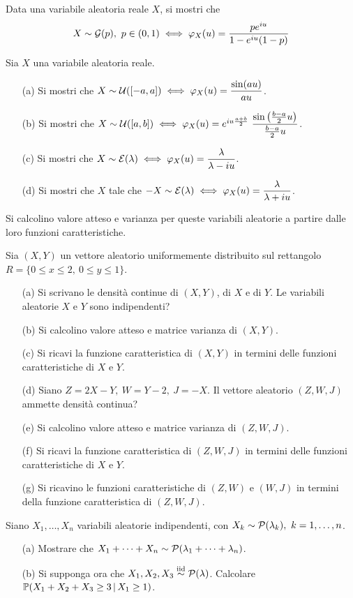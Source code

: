 \Esercizio{} %
Data una variabile aleatoria reale $X$, si mostri che
\[
X\sim \mathcal{G}(p),\ p\in(0,1)\iff \varphi_X(u)=\frac{pe^{iu}}{1-e^{iu}(1-p)}
\]

\Esercizio{} %
Sia $X$ una variabile aleatoria reale.
\begin{enumerate}
\item [(a)] Si mostri che $X\sim \mathcal{U}([-a,a])\iff\varphi_X(u)=\dfrac{\sin(au)}{au}$.
\item [(b)] Si mostri che $X\sim  \Uc([a,b])\iff\varphi_X(u)=e^{iu\frac{a+b}{2}}\ \dfrac{\sin\left(\frac{b-a}{2}u\right)}{\frac{b-a}{2}u}$.
\item [(c)] Si mostri che $X\sim\mathcal{E}(\lambda)\iff\varphi_X(u)=\dfrac{\lambda}{\lambda-iu}$.
\item [(d)] Si mostri che $X$ tale che $-X\sim\mathcal{E}(\lambda)\iff\varphi_X(u)=\dfrac{\lambda}{\lambda+iu}$.
\end{enumerate}
Si calcolino valore atteso e varianza per queste variabili aleatorie a partire dalle loro funzioni caratteristiche.

\Esercizio{} %
Sia $(X,Y)$ un vettore aleatorio uniformemente distribuito sul rettangolo $R=\{0\leq x\leq 2,\ 0\leq y\leq 1\}$.
\begin{itemize}
\item [(a)] Si scrivano le densità continue di $(X,Y)$, di $X$ e di $Y$. Le variabili aleatorie $X$ e $Y$ sono indipendenti?
\item [(b)] Si calcolino valore atteso e matrice varianza di $(X,Y)$.
\item [(c)] Si ricavi la funzione caratteristica di $(X,Y)$ in termini delle funzioni caratteristiche di $X$ e $Y$.
\item [(d)] Siano $Z=2X-Y,\ W=Y-2,\ J=-X$. Il vettore aleatorio $(Z,W,J)$ ammette densità continua?
\item [(e)] Si calcolino valore atteso e matrice varianza di $(Z,W,J)$.
\item [(f)] Si ricavi la funzione caratteristica di $(Z,W,J)$ in termini delle funzioni caratteristiche di $X$ e $Y$.
\item [(g)] Si ricavino le funzioni caratteristiche di $(Z,W)$ e $(W,J)$ in termini della funzione caratteristica di $(Z,W,J)$.
\end{itemize}

\Esercizio{} %
Siano $X_1,\dots,X_n$ variabili aleatorie indipendenti, con $X_k\sim\mathcal{P}(\lambda_k),\ k=1,\dots,n$.
\begin{itemize}
\item [(a)] Mostrare che $X_1+\cdots+X_n\sim\mathcal{P}(\lambda_1+\cdots+\lambda_n)$.
\item [(b)] Si supponga ora che $X_1,X_2,X_3\stackrel{\mathrm{iid}}{\sim}\mathcal{P}(\lambda)$. Calcolare $\mathbb{P}(X_1+X_2+X_3\geq 3\,|\,X_1\geq 1)$. 
\end{itemize}

